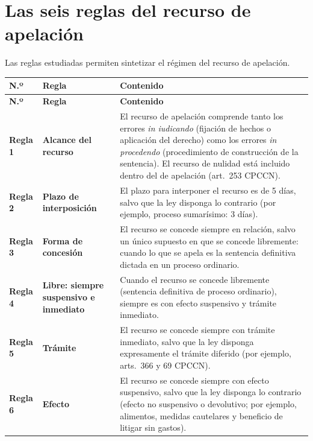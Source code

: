 \documentclass[12pt,oneside]{book}
\begin{document}
\section{Las seis reglas del recurso de apelación}

Las reglas estudiadas permiten sintetizar el régimen del recurso de apelación.

\begin{longtable}{
    >{\raggedright\arraybackslash}p{}
    >{\raggedright\arraybackslash}p{}
    >{\raggedright\arraybackslash}p{}
}
\toprule
\textbf{N.º} & \textbf{Regla} & \textbf{Contenido} \\
\midrule
\endfirsthead
\toprule
\textbf{N.º} & \textbf{Regla} & \textbf{Contenido} \\
\midrule
\endhead
\bottomrule
\endlastfoot

\textbf{Regla 1} & \textbf{Alcance del recurso} & El recurso de apelación comprende tanto los errores \textit{in iudicando} (fijación de hechos o aplicación del derecho) como los errores \textit{in procedendo} (procedimiento de construcción de la sentencia). El recurso de nulidad está incluido dentro del de apelación (art.~253 CPCCN). \\
\addlinespace
\textbf{Regla 2} & \textbf{Plazo de interposición} & El plazo para interponer el recurso es de 5 días, salvo que la ley disponga lo contrario (por ejemplo, proceso sumarísimo: 3 días). \\
\addlinespace
\textbf{Regla 3} & \textbf{Forma de concesión} & El recurso se concede siempre en relación, salvo un único supuesto en que se concede libremente: cuando lo que se apela es la sentencia definitiva dictada en un proceso ordinario. \\
\addlinespace
\textbf{Regla 4} & \textbf{Libre: siempre suspensivo e inmediato} & Cuando el recurso se concede libremente (sentencia definitiva de proceso ordinario), siempre es con efecto suspensivo y trámite inmediato. \\
\addlinespace
\textbf{Regla 5} & \textbf{Trámite} & El recurso se concede siempre con trámite inmediato, salvo que la ley disponga expresamente el trámite diferido (por ejemplo, arts.~366 y 69 CPCCN). \\
\addlinespace
\textbf{Regla 6} & \textbf{Efecto} & El recurso se concede siempre con efecto suspensivo, salvo que la ley disponga lo contrario (efecto no suspensivo o devolutivo; por ejemplo, alimentos, medidas cautelares y beneficio de litigar sin gastos). \\
\end{longtable}
\end{document}
